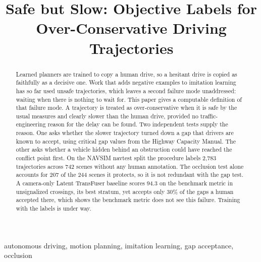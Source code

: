 \documentclass[conference]{IEEEtran}
\begin{document}
\title{Safe but Slow: Objective Labels for\\Over-Conservative Driving Trajectories}

\author{
\and
{}
}

\maketitle

\begin{abstract}
Learned planners are trained to copy a human drive, so a hesitant drive is copied
as faithfully as a decisive one. Work that adds negative examples to imitation
learning has so far used unsafe trajectories, which leaves a second failure mode
unaddressed: waiting when there is nothing to wait for. This paper gives a
computable definition of that failure mode. A trajectory is treated as
over-conservative when it is safe by the usual measures and clearly slower than
the human drive, provided no traffic-engineering reason for the delay can be
found. Two independent tests supply the reason. One asks whether the slower
trajectory turned down a gap that drivers are known to accept, using critical
gap values from the Highway Capacity Manual. The other asks whether a vehicle
hidden behind an obstruction could have reached the conflict point first. On the
NAVSIM navtest split the procedure labels 2{,}783 trajectories across 742
scenes without any human annotation. The occlusion test alone accounts for 207
of the 244 scenes it protects, so it is not redundant with the gap test. A
camera-only Latent TransFuser baseline scores 94.3 on the benchmark metric in
unsignalized crossings, its best stratum, yet accepts only 30\% of the gaps a
human accepted there, which shows the benchmark metric does not see this
failure. Training with the labels is under way.
\end{abstract}

\begin{IEEEkeywords}
autonomous driving, motion planning, imitation learning, gap acceptance, occlusion
\end{IEEEkeywords}
\end{document}
